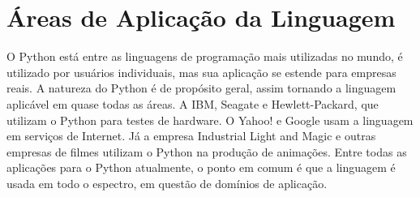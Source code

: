
   \section{Áreas de Aplicação da Linguagem}
   O Python está entre as linguagens de programação mais utilizadas no mundo, é utilizado por usuários individuais, mas sua aplicação se estende para empresas reais. A natureza do Python é de propósito geral, assim tornando a linguagem aplicável em quase todas as áreas. A IBM, Seagate e Hewlett-Packard, que utilizam o Python para testes de hardware. O Yahoo! e Google usam a linguagem em serviços de Internet. Já a empresa Industrial Light and Magic e outras empresas de filmes utilizam o Python na produção de animações. Entre todas as aplicações para o Python atualmente, o ponto em comum é que a linguagem é usada em todo o espectro, em questão de domínios de aplicação. \cite{Lutz2007}

